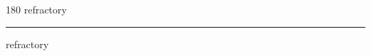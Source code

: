 
\begin{frame}
\begin{center}
\begin{turn}{180}
{\fontsize{2.5cm}{1em}\selectfont refractory}
\end{turn}
\vspace{1em}\par  
\hrule
\vspace{1em}\par  
{\fontsize{2.5cm}{1em}\selectfont refractory}
\end{center}
\end{frame}
